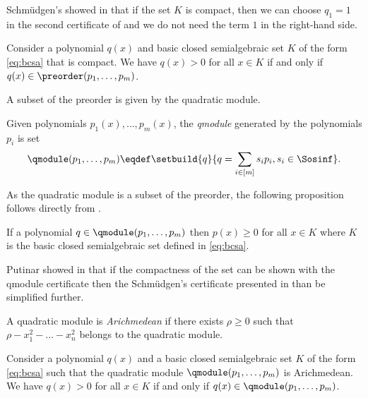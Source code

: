 \documentclass[11pt,twoside,a4paper,openright]{uclouvain-thesis}
\begin{document}
Schm{\"u}dgen's showed in \cite{schmudgen1991thek} that
if the set $K$ is compact, then we can choose $q_1 = 1$ in the second
certificate of  and we do not need the term $1$ in the right-hand side.

\begin{mytheo}
  \label{theo:schmudgen}
  Consider a polynomial $q(x)$ and basic closed semialgebraic set $K$ of the form \eqref{eq:bcsa} that is compact.
  We have $q(x) > 0$ for all $x \in K$ if and only if
  $q(x) \in \preorder(p_1, \ldots, p_m)$.
\end{mytheo}

A subset of the preorder is given by the quadratic module.

\begin{mydef}
  \label{def:qmodule}
  Given polynomials $p_1(x), \ldots, p_m(x)$, the \emph{qmodule} generated by
  the polynomials $p_i$ is set
  \begin{equation}
    \label{eq:qmodule}
    \qmodule(p_1, \ldots, p_m) \eqdef
    \setbuild{q}{q = \sum_{i \in [m]} s_i p_i, s_i \in \Sosinf}.
  \end{equation}
\end{mydef}

As the quadratic module is a subset of the preorder, the following
proposition follows directly from .

\begin{myprop}
  \label{prop:qmodule}
  If a polynomial $q \in \qmodule(p_1, \ldots, p_m)$
  then $p(x) \ge 0$ for all $x \in K$ where $K$ is the basic closed semialgebraic
  set defined in \eqref{eq:bcsa}.
\end{myprop}

Putinar showed in \cite{putinar1993positive} that if the compactness of the set
can be shown with the qmodule certificate then the Schm{\"u}dgen's certificate presented in  than be simplified further.

\begin{mydef}[Arichmedean]
  A quadratic module is \emph{Arichmedean} if there exists $\rho \ge 0$ such that
  $\rho - x_1^2 - \ldots - x_n^2$ belongs to the quadratic module.
\end{mydef}

\begin{mytheo}
  Consider a polynomial $q(x)$ and a basic closed semialgebraic set $K$ of the form \eqref{eq:bcsa}
  such that the quadratic module $\qmodule(p_1, \ldots, p_m)$ is Arichmedean.
  We have $q(x) > 0$ for all $x \in K$ if and only if
  $q(x) \in \qmodule(p_1, \ldots, p_m)$.
\end{mytheo}
\end{document}
